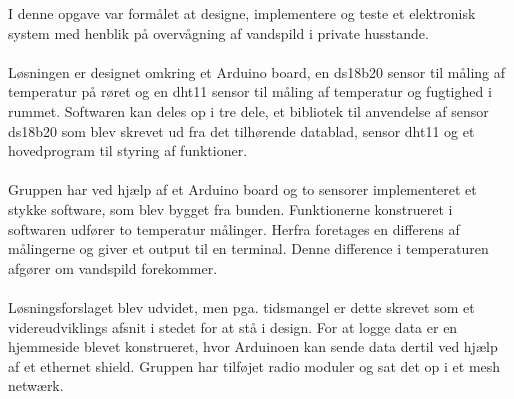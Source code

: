 I denne opgave var formålet at designe, implementere og teste et elektronisk system med henblik på overvågning af vandspild i private husstande.
\\ 
\\
Løsningen er designet omkring et Arduino board, en ds18b20 sensor til måling af temperatur på røret og en dht11 sensor til måling af temperatur og fugtighed i  rummet. Softwaren kan deles op i tre dele, et bibliotek til anvendelse af sensor ds18b20 som blev skrevet ud fra det tilhørende datablad, sensor dht11  og et hovedprogram til styring af funktioner.            
\\
\\
Gruppen har ved hjælp af et Arduino board og to sensorer implementeret et stykke software, som blev bygget fra bunden. Funktionerne konstrueret i softwaren udfører to temperatur målinger. Herfra foretages en differens af målingerne og giver et output til en terminal. Denne difference i temperaturen afgører om vandspild forekommer.
\\
\\
Løsningsforslaget blev udvidet, men pga. tidsmangel er dette skrevet som et videreudviklings afsnit i stedet for at stå i design. 
For at logge data er en hjemmeside blevet konstrueret, hvor Arduinoen kan sende data dertil ved hjælp af et ethernet shield.
Gruppen har tilføjet radio moduler og sat det op i  et mesh netwærk.



